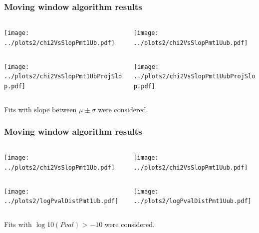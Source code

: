 \documentclass[aspectratio=169]{beamer}
\begin{document}
\begin{frame}
  \frametitle{Moving window algorithm results}
  \vspace{0.5cm}
  \begin{columns}
    \begin{column}{0.5\textwidth}
      \texttt{[image: ../plots2/chi2VsSlopPmt1Ub.pdf]}
    \end{column}
    \begin{column}{0.5\textwidth}
      \texttt{[image: ../plots2/chi2VsSlopPmt1Uub.pdf]}
    \end{column}
  \end{columns}
  \begin{columns}
    \begin{column}{0.5\textwidth}
      \texttt{[image: ../plots2/chi2VsSlopPmt1UbProjSlop.pdf]}
    \end{column}
    \begin{column}{0.5\textwidth}
      \texttt{[image: ../plots2/chi2VsSlopPmt1UubProjSlop.pdf]}
    \end{column}
  \end{columns}
  {\footnotesize 
    Fits with slope between $\mu\pm\sigma$ were considered.
  }
\end{frame}

\begin{frame}
  \frametitle{Moving window algorithm results}
  \vspace{0.5cm}
  \begin{columns}
    \begin{column}{0.5\textwidth}
      \texttt{[image: ../plots2/chi2VsSlopPmt1Ub.pdf]}
    \end{column}
    \begin{column}{0.5\textwidth}
      \texttt{[image: ../plots2/chi2VsSlopPmt1Uub.pdf]}
    \end{column}
  \end{columns}
  \begin{columns}
    \begin{column}{0.5\textwidth}
      \texttt{[image: ../plots2/logPvalDistPmt1Ub.pdf]}
    \end{column}
    \begin{column}{0.5\textwidth}
      \texttt{[image: ../plots2/logPvalDistPmt1Uub.pdf]}
    \end{column}
  \end{columns}
  {\footnotesize 
    Fits with $\log10(Pval)$ > $-10$ were considered.
  }
\end{frame}
\end{document}
